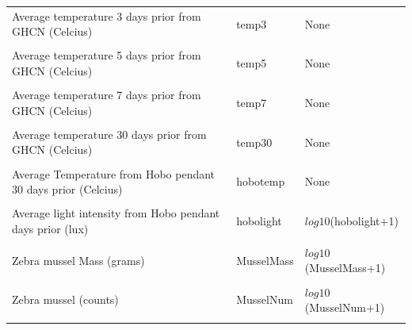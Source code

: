 \begin{longtable}{p{3.5cm}p{1cm}p{3.3cm}}
Average temperature 3 days prior from GHCN (Celcius) & temp3&  None \\ \\
Average temperature 5 days prior from GHCN (Celcius) & temp5 & None \\ \\
Average temperature 7 days prior  from GHCN (Celcius) &  temp7 & None \\ \\
Average temperature 30 days prior from GHCN (Celcius) & temp30 &  None \\ \\
Average Temperature from Hobo pendant 30 days prior (Celcius) & hobotemp & None \\ \\
Average light intensity from Hobo pendant days prior (lux) & hobolight & $log10$(hobolight+1) \\ \\
Zebra mussel Mass (grams) & MusselMass &  $log10$(MusselMass+1) \\ \\
Zebra mussel (counts) &  MusselNum & $log10$(MusselNum+1) \\ \\
\hline
\end{longtable}

